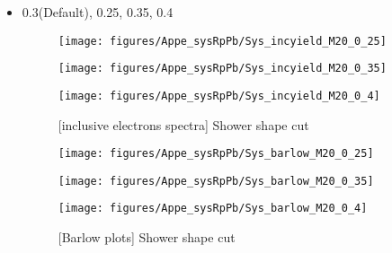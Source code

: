  \begin{itemize}
      \item 0.3(Default), 0.25, 0.35, 0.4
      
            \begin{figure}[H]
      	\begin{minipage}{0.33\hsize} 
      	\begin{center}
      	\texttt{[image: figures/Appe\_sysRpPb/Sys\_incyield\_M20\_0\_25]}
      	\end{center}
      	\end{minipage}
      	\begin{minipage}{0.33\hsize} 
      	\begin{center}
      	\texttt{[image: figures/Appe\_sysRpPb/Sys\_incyield\_M20\_0\_35]}
      	\end{center}
      	\end{minipage}
      	\begin{minipage}{0.33\hsize} 
      	\begin{center}
      	\texttt{[image: figures/Appe\_sysRpPb/Sys\_incyield\_M20\_0\_4]}
      	\end{center}
      	\end{minipage}
      \caption{[inclusive electrons spectra] Shower shape cut}
      \label{fig:Sys_M20}
      \end{figure}
      
      \begin{figure}[H]
      	\begin{minipage}{0.33\hsize} 
      	\begin{center}
      	\texttt{[image: figures/Appe\_sysRpPb/Sys\_barlow\_M20\_0\_25]}
      	\end{center}
      	\end{minipage}
      	\begin{minipage}{0.33\hsize} 
      	\begin{center}
      	\texttt{[image: figures/Appe\_sysRpPb/Sys\_barlow\_M20\_0\_35]}
      	\end{center}
      	\end{minipage}
      	\begin{minipage}{0.33\hsize} 
      	\begin{center}
      	\texttt{[image: figures/Appe\_sysRpPb/Sys\_barlow\_M20\_0\_4]}
      	\end{center}
      	\end{minipage}
      \caption{[Barlow plots] Shower shape cut}
      \label{fig:Sys_M20}
      \end{figure}
      
 \end{itemize}
 
